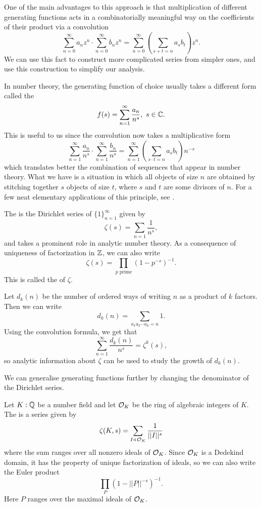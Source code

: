 \documentclass[12pt, a4paper]{report}
\begin{document}
One of the main advantages to
this approach is that multiplication of different generating functions acts in
a combinatorially meaningful way on the coefficients of their product via a
convolution
\[\sum\limits_{n=0}^\infty a_n z^n \cdot \sum_{n=0}^\infty b_n z^n =
\sum\limits_{n=0}^\infty \left( \sum\limits_{s+t = n} a_sb_t \right)z^n.\]
We can use this fact to construct more complicated series from
simpler ones, and use this construction to simplify our analysis.

In number theory, the generating function of choice usually takes a different
form called the 
\[f(s) = \sum\limits_{n=1}^\infty\frac{a_n}{n^s}, \,\, s \in {\mathbb C}. \]
This is useful to us since the convolution now takes a multiplicative form
\[\sum\limits_{n=1}^\infty\frac{a_n}{n^s} \cdot
  \sum\limits_{n=1}^\infty\frac{b_n}{n^s} =
  \sum\limits_{n=1}^\infty \left( \sum\limits_{s \cdot t = n} a_sb_t \right) n^{-s}\]
which translates better the combination of sequences that appear in number
theory. What we have is a situation in which all
objects of size $n$ are obtained by stitching together $s$ objects of size $t$,
where $s$ and $t$ are some divisors of $n$.
For a few neat elementary applications of this principle, see \cite[Section 2.6, pages 59-68]{wilf}.

\begin{example}
  The  is the Dirichlet series of
  $\{1\}_{n=1}^\infty$ given by
  \[\zeta(s) = \sum\limits_{n=1} \frac{1}{n^s},\]
  and takes a prominent role in analytic number theory.
  As a consequence of uniqueness of factorization in ${\mathbb Z}$, we can also write
  \[\zeta(s) = \prod\limits_{p \text{ prime}}\left( 1-p^{-s} \right)^{-1}.\]
  This is called the  of $\zeta.$
\end{example}

\begin{example}
  Let $d_k(n)$ be the number of ordered ways of writing $n$ as a product of $k$
  factors. Then we can write
  \[d_k(n) = \sum\limits_{a_1 a_2 \cdots a_k = n} 1.\]
  Using the convolution formula, we get that
  \[\sum\limits_{n=1}^\infty \frac{d_k(n)}{n^s} = \zeta^k(s),\]
  so analytic information about $\zeta$ can be used to study the growth of
  $d_k(n).$
\end{example}

We can generalise generating functions further by changing the denominator of
the Dirichlet series. 

\begin{example}
  Let $K : {\mathbb Q}$ be a number field and let ${\mathcal O}_K$ be the ring of algebraic
  integers of $K$.
  The  is
  a series given by 
  \[\zeta(K,s) = \sum\limits_{I \triangleleft \, {\mathcal O}_K} \frac{1}{||I||^s} \]
  where the sum ranges over all nonzero ideals of ${\mathcal O}_K$.
  Since ${\mathcal O}_K$ is a Dedekind domain, it has the property of unique
  factorization of ideals, so we can also write the Euler product
  \[\prod\limits_P \left( 1-||P||^{-s} \right)^{-1}.\]
  Here $P$ ranges over the maximal ideals of ${\mathcal O}_K$. 
\end{example}
\end{document}
